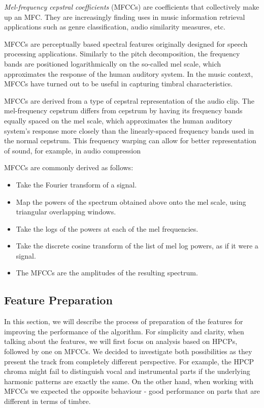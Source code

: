 \textit{Mel-frequency cepstral coefficients} (MFCCs) are coefficients that collectively make up an MFC. They are increasingly finding uses in music information retrieval applications such as genre classification, audio similarity measures, etc.

MFCCs are perceptually based spectral features originally designed for speech processing applications. Similarly to the pitch decomposition, the frequency bands are positioned logarithmically on the so-called mel scale, which approximates the response of the human auditory system. In the music context, MFCCs have turned out to be useful in capturing timbral characteristics.

MFCCs are derived from a type of cepstral representation of the audio clip. The mel-frequency cepstrum differs from cepstrum by having its frequency bands equally spaced on the mel scale, which approximates the human auditory system's response more closely than the linearly-spaced frequency bands used in the normal cepstrum. This frequency warping can allow for better representation of sound, for example, in audio compression \cite{mfcc}

MFCCs are commonly derived as follows:
\begin{itemize}
\item Take the Fourier transform of a signal.
\item Map the powers of the spectrum obtained above onto the mel scale, using triangular overlapping windows.
\item Take the logs of the powers at each of the mel frequencies.
\item Take the discrete cosine transform of the list of mel log powers, as if it were a signal.
\item The MFCCs are the amplitudes of the resulting spectrum.
\end{itemize}

\vspace{10pt}

\subsection{Feature Preparation}

In this section, we will describe the process of preparation of the features for improving the performance of the algorithm. For simplicity and clarity, when talking about the features, we will first focus on analysis based on HPCPs, followed by one on MFCCs.
We decided to investigate both possibilities as they present the track from completely different perspective. For example, the HPCP chroma might fail to distinguish vocal and instrumental parts if the underlying harmonic patterns are exactly the same. On the other hand, when working with MFCCs we expected the opposite behaviour - good performance on parts that are different in terms of timbre.

